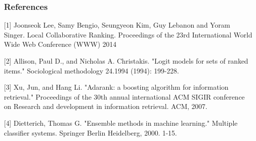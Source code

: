 \subsubsection*{References}
\label{sec:references}

\small{
[1] Joonseok Lee, Samy Bengio, Seungyeon Kim, Guy Lebanon and Yoram Singer. Local Collaborative Ranking. Proceedings of the 23rd International World Wide Web Conference (WWW) 2014

[2] Allison, Paul D., and Nicholas A. Christakis. "Logit models for sets of ranked items." Sociological methodology 24.1994 (1994): 199-228.

[3] Xu, Jun, and Hang Li. "Adarank: a boosting algorithm for information retrieval." Proceedings of the 30th annual international ACM SIGIR conference on Research and development in information retrieval. ACM, 2007.

[4] Dietterich, Thomas G. "Ensemble methods in machine learning." Multiple classifier systems. Springer Berlin Heidelberg, 2000. 1-15.
}
